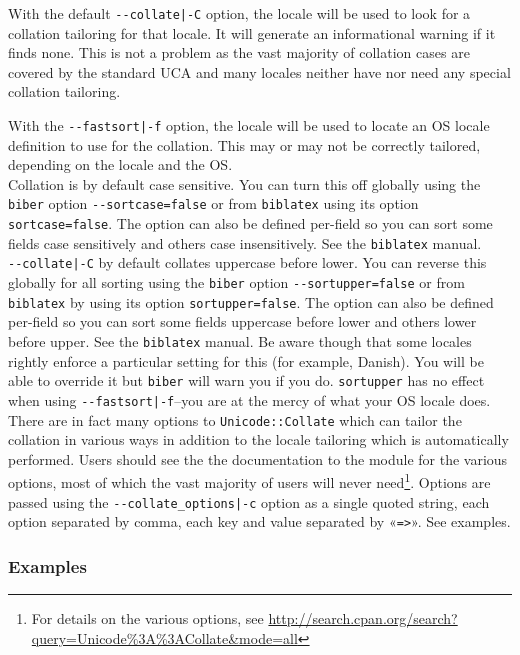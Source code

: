 \documentclass{ltxdockit}
\begin{document}
\noindent With the default \verb+--collate|-C+ option, the locale will
be used to look for a collation tailoring for that locale. It will generate an
informational warning if it finds none. This is not a problem as the vast
majority of collation cases are covered by the standard UCA and many
locales neither have nor need any special collation tailoring.

With the \verb+--fastsort|-f+ option, the locale will be
used to locate an OS locale definition to use for the collation. This
may or may not be correctly tailored, depending on the locale and the OS.\\[1ex]

\noindent Collation is by default case sensitive. You can turn this
off globally using the \verb+biber+ option \verb+--sortcase=false+ or from
\verb+biblatex+ using its option \verb+sortcase=false+. The option can also
be defined per-field so you can sort some fields case sensitively and
others case insensitively. See the \verb+biblatex+ manual.\\[1ex]

\noindent \verb+--collate|-C+ by default collates uppercase before lower.
You can reverse this globally for all sorting using the \verb+biber+ option
\verb+--sortupper=false+ or from \verb+biblatex+ by using its option
\verb+sortupper=false+. The option can also be defined per-field so you can
sort some fields uppercase before lower and others lower before upper. See the
\verb+biblatex+ manual. Be aware though that some locales rightly enforce a
particular setting for this (for example, Danish). You will be able to
override it but \verb+biber+ will warn you if you do. \verb+sortupper+ has
no effect when using \verb+--fastsort|-f+--you are at the mercy of what
your OS locale does.\\[1ex]

There are in fact many options to \verb+Unicode::Collate+
which can tailor the collation in various ways in
addition to the locale tailoring which is automatically performed.
Users should see the the documentation to the module for the various
options, most of which the vast majority of users will never
need\footnote{For details on the various options, see
  \url{http://search.cpan.org/search?query=Unicode\%3A\%3ACollate&mode=all}}.
Options are passed using the \verb+--collate_options|-c+ option as a
single quoted string, each option separated by comma, each key and
value separated by «\verb+=>+». See examples.

\subsubsection{Examples}
\end{document}
